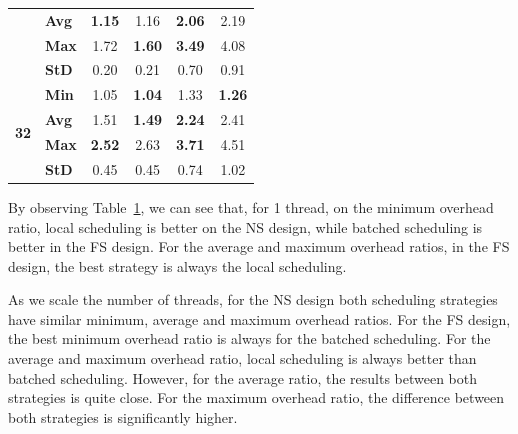 \documentclass{llncs}
\begin{document}
\begin{table}[!ht]
\begin{tabular}{ll|cc|cc}
& {\bf Avg }& {\bf 1.15}& 1.16& {\bf 2.06}& 2.19\\
& {\bf Max }& 1.72& {\bf 1.60}& {\bf 3.49}& 4.08\\
& {\bf StD }& 0.20& 0.21& 0.70& 0.91\\
\hline
\multirow{4}{*}{\bf 32}
& {\bf Min }& 1.05& {\bf 1.04}& 1.33& {\bf 1.26}\\
& {\bf Avg }& 1.51& {\bf 1.49}& {\bf 2.24}& 2.41\\
& {\bf Max }& {\bf 2.52}& 2.63& {\bf 3.71}& 4.51\\
& {\bf StD }& 0.45& 0.45& 0.74& 1.02\\
\hline\hline
\end{tabular}%
\label{tab_batched_overhead}
\vspace{-0.7\intextsep}
\end{table}

By observing Table~\ref{tab_batched_overhead}, we can see that, for 1
thread, on the minimum overhead ratio, local scheduling is better on
the NS design, while batched scheduling is better in the FS
design. For the average and maximum overhead ratios, in the FS design,
the best strategy is always the local scheduling.   

As we scale the number of threads, for the NS design both scheduling
strategies have similar minimum, average and maximum overhead
ratios. For the FS design, the best minimum overhead ratio is always
for the batched scheduling. For the average and maximum overhead
ratio, local scheduling is always better than batched
scheduling. However, for the average ratio, the results between both
strategies is quite close. For the maximum overhead ratio, the
difference between both strategies is significantly higher. 

\end{document}
